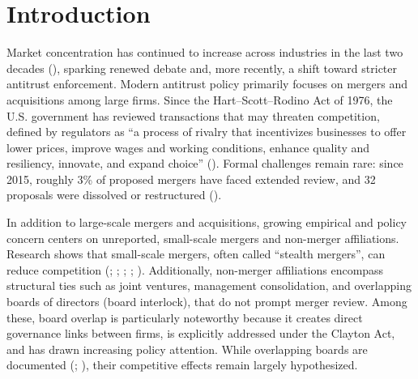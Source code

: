 \documentclass[12pt]{article}
\begin{document}
	
	

	
	\onehalfspacing
	
	\newpage

    \section{Introduction}

    Market concentration has continued to increase across industries in the last two decades (\cite{grullon2019us}), sparking renewed debate and, more recently, a shift toward stricter antitrust enforcement. Modern antitrust policy primarily focuses on mergers and acquisitions among large firms. Since the Hart–Scott–Rodino Act of 1976, the U.S. government has reviewed transactions that may threaten competition, defined by regulators as “a process of rivalry that incentivizes businesses to offer lower prices, improve wages and working conditions, enhance quality and resiliency, innovate, and expand choice” (\cite{DOJFTC2023MergerGuidelines}). Formal challenges remain rare: since 2015, roughly 3\% of proposed mergers have faced extended review, and 32 proposals were dissolved or restructured (\cite{ConversableEconomist2025Antitrust}).

    In addition to large-scale mergers and acquisitions, growing empirical and policy concern centers on unreported, small-scale mergers and non-merger affiliations. Research shows that small-scale mergers, often called “stealth mergers”, can reduce competition (\cite{majerovitz2021consolidation}; \cite{aggarwal2025stealth}; \cite{wollmann2019stealth}; \cite{wollmann2020get}; \cite{kepler2023stealth}). Additionally, non-merger affiliations encompass structural ties such as joint ventures, management consolidation, and overlapping boards of directors (board interlock), that do not prompt merger review. Among these, board overlap is particularly noteworthy because it creates direct governance links between firms, is explicitly addressed under the Clayton Act, and has drawn increasing policy attention. While overlapping boards are documented (\cite{LemleyVanLoo2025OverlappingDirectors}; \cite{Poberejsky2025InterlocksInnovation}), their competitive effects remain largely hypothesized.
\end{document}
